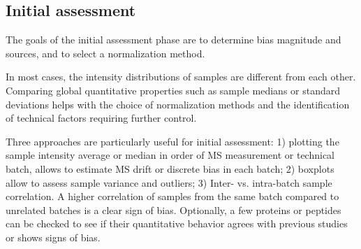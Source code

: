 \documentclass[num-refs]{wiley-article}
\begin{document}
\subsection{Initial assessment}
The goals of the initial assessment phase are to determine bias magnitude and sources, and to select a normalization method.

In most cases, the intensity distributions of samples are different from each other. Comparing global quantitative properties such as sample medians or standard deviations helps with the choice of normalization methods and the identification of technical factors requiring further control. 

Three approaches are particularly useful for initial assessment: 1) plotting the sample intensity average or median in order of MS measurement or technical batch, allows to estimate MS drift or discrete bias in each batch; 2) boxplots allow to assess sample variance and outliers; 3) Inter- vs. intra-batch sample correlation. A higher correlation of samples from the same batch compared to unrelated batches is a clear sign of bias. Optionally, a few proteins or peptides can be checked to see if their quantitative behavior agrees with previous studies or shows signs of bias.
\end{document}
